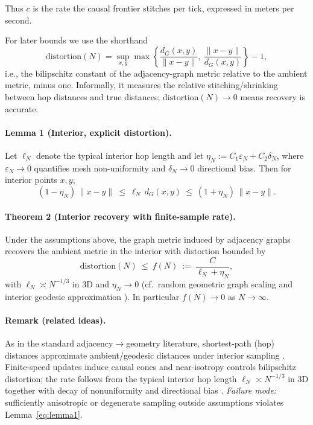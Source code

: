 Thus \(c\) is the rate the causal frontier stitches per tick, expressed in meters per second.




For later bounds we use the shorthand
\[
\text{distortion}(N)=\sup_{x,y}\max\!\left\{\frac{d_G(x,y)}{\lVert x-y\rVert},\ \frac{\lVert x-y\rVert}{d_G(x,y)}\right\}-1,
\]
i.e., the bilipschitz constant of the adjacency-graph metric relative to the ambient metric, minus one. Informally, it measures the relative stitching/shrinking between hop distances and true distances; $\text{distortion}(N)\to 0$ means recovery is accurate.

\paragraph{Lemma 1 (Interior, explicit distortion).}
Let $\ell_N$ denote the typical interior hop length and let $\eta_N:=C_1\varepsilon_N+C_2\delta_N$, where $\varepsilon_N\to 0$ quantifies mesh non-uniformity and $\delta_N\to 0$ directional bias. Then for interior points $x,y$,
\begin{equation}
(1-\eta_N)\,\lVert x-y\rVert \ \le\ \ell_N\, d_G(x,y) \ \le\ (1+\eta_N)\,\lVert x-y\rVert.
\label{eq:lemma1}
\end{equation}

\paragraph{Theorem 2 (Interior recovery with finite-sample rate).}
Under the assumptions above, the graph metric induced by adjacency graphs recovers the ambient metric in the interior with distortion bounded by
\begin{equation}
\text{distortion}(N)\ \le\ f(N)\ :=\ \frac{C}{\ell_N+\eta_N},
\label{eq:theorem2}
\end{equation}
with $\ell_N\asymp N^{-1/3}$ in 3D and $\eta_N\to 0$ (cf.\ random geometric graph scaling and interior geodesic approximation \cite{penrose2003,tenenbaum2000}). In particular $f(N)\to 0$ as $N\to\infty$.

\paragraph{Remark (related ideas).}
As in the standard adjacency$\to$geometry literature, shortest-path (hop) distances approximate ambient/geodesic distances under interior sampling \cite{tenenbaum2000}. Finite-speed updates induce causal cones and near-isotropy controls bilipschitz distortion; the rate follows from the typical interior hop length $\ell_N\asymp N^{-1/3}$ in 3D together with decay of nonuniformity and directional bias \cite{penrose2003}. \emph{Failure mode:} sufficiently anisotropic or degenerate sampling outside assumptions violates Lemma~\ref{eq:lemma1}.

